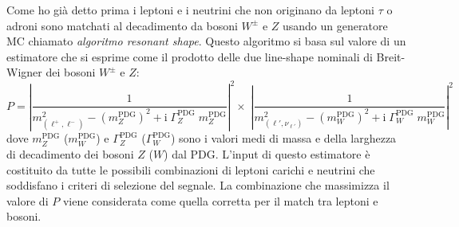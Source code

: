 \documentclass[11pt]{article}
\begin{document}
Come ho già detto prima i leptoni e i neutrini che non originano da leptoni $\tau$ o adroni sono matchati al decadimento da bosoni $W^\pm$ e $Z$ usando un generatore MC chiamato \textit{ algoritmo resonant shape}. Questo algoritmo si basa sul valore di un estimatore che si esprime come il prodotto delle due line-shape nominali di Breit-Wigner dei bosoni $W^\pm$ e $Z$:
\begin{equation*}
    P = \left| \frac{1}{ m^2_{(\ell^+,\ell^-)} - \left(m_Z^{\textrm{PDG}}\right)^2 + \textrm{i} \; \Gamma_Z^{\textrm{PDG}} \; m_Z^{\textrm{PDG}} } \right|^2  \times \; \left| \frac{1}{ m^2_{(\ell',\nu_{\ell'})} - \left(m_W^{\textrm{PDG}}\right)^2 + \textrm{i} \; \Gamma_W^{\textrm{PDG}} \; m_W^{\textrm{PDG}} } \right|^2 
\end{equation*}
dove $m_Z^{\textrm{PDG}}$ ($m_W^{\textrm{PDG}}$) e $\Gamma_Z^{\textrm{PDG}}$ ($\Gamma_W^{\textrm{PDG}}$)  sono i valori medi di massa e della larghezza di decadimento dei bosoni $Z$ ($W$) dal PDG. L'input di questo estimatore è costituito da tutte le possibili combinazioni di leptoni carichi e neutrini che soddisfano i criteri di selezione del segnale. La combinazione che massimizza il valore di $P$ viene considerata come quella corretta per il match tra leptoni e bosoni.
\end{document}
